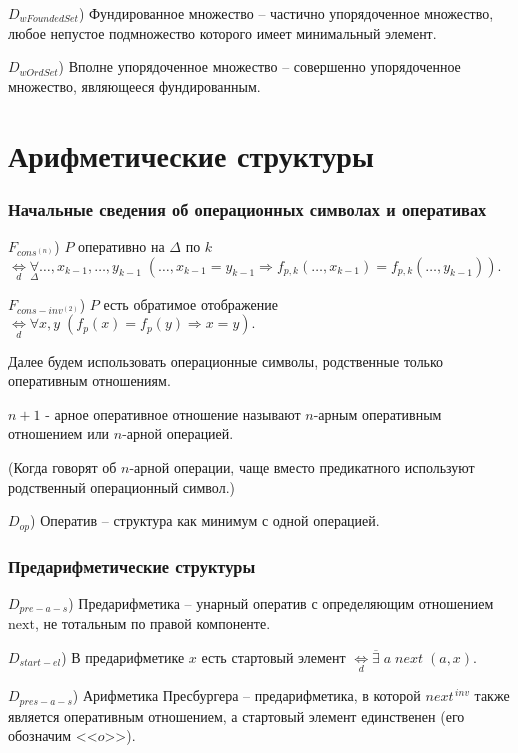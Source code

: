 \documentclass[a4paper]{article}
\newcommand{\Def}[0]{\underset{d}{\Leftrightarrow}}
\begin{document}
$D_{wFoundedSet}$) Фундированное множество -- частично упорядоченное множество, любое непустое подмножество которого имеет минимальный элемент.

$D_{wOrdSet}$) Вполне упорядоченное множество -- совершенно упорядоченное множество, являющееся фундированным.

\clearpage


\part{Арифметические структуры}

\section{Начальные сведения об операционных символах и оперативах}

$F_{cons^{(n)}}$) $P$ оперативно на $\Delta$ по $k$ $\Def \underset{\Delta}{\forall} \dots , x_{k-1},\dots, y_{k-1}\; (\dots, x_{k-1} = y_{k-1} \Rightarrow f_{p, k}(\dots, x_{k-1}) = f_{p, k}(\dots, y_{k-1})).$

$F_{cons-inv^{(2)}}$) $P$ есть обратимое отображение $\Def \forall x, y\; (f_p(x) = f_p(y) \Rightarrow x = y).$

Далее будем использовать операционные символы, родственные только оперативным отношениям.

$n+1$ - арное оперативное отношение называют $n$-арным оперативным отношением или $n$-арной операцией.

(Когда говорят об $n$-арной операции, чаще вместо предикатного используют родственный операционный символ.)

$D_{op}$) Оператив -- структура как минимум с одной операцией.

\section{Предарифметические структуры}

$D_{pre-a-s}$) Предарифметика -- унарный оператив с определяющим отношением $\mathrm{next}$, не тотальным по правой компоненте.

$D_{start-el}$) В предарифметике $x$ есть стартовый элемент $\Def \overline{\exists}\; a \; next \; (a, x).$

$D_{pres-a-s}$) Арифметика Пресбургера -- предарифметика, в которой $next^{\,inv}$ также является оперативным отношением, а стартовый элемент единственен (его обозначим <<$o$>>).
\end{document}
